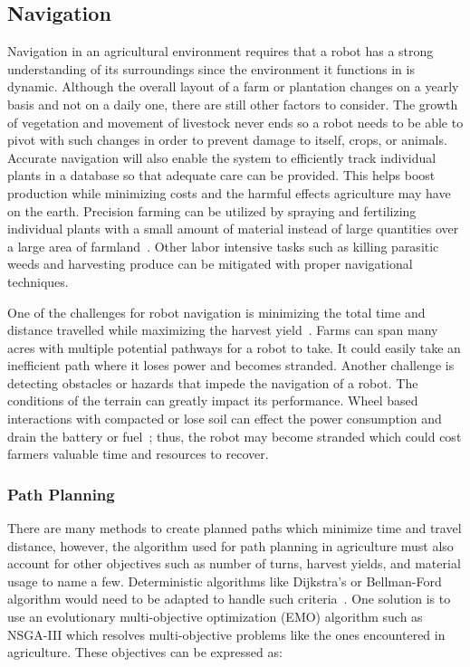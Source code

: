 \documentclass[12pt]{article}
\begin{document}
\subsection{Navigation}
Navigation in an agricultural environment requires that a robot has a strong understanding of its surroundings since the environment it functions in is dynamic. Although the overall layout of a farm or plantation changes on a yearly basis and not on a daily one, there are still other factors to consider. The growth of vegetation and movement of livestock never ends so a robot needs to be able to pivot with such changes in order to prevent damage to itself, crops, or animals. Accurate navigation will also enable the system to efficiently track individual plants in a database so that adequate care can be provided. This helps boost production while minimizing costs and the harmful effects agriculture may have on the earth. Precision farming can be utilized by spraying and fertilizing individual plants with a small amount of material instead of large quantities over a large area of farmland~\cite{LEPEJ2016160}. Other labor intensive tasks such as killing parasitic weeds and harvesting produce can be mitigated with proper navigational techniques.

One of the challenges for robot navigation is minimizing the total time and distance travelled while maximizing the harvest yield~\cite{MAHMUD2019488}. Farms can span many acres with multiple potential pathways for a robot to take. It could easily take an inefficient path where it loses power and becomes stranded. Another challenge is detecting obstacles or hazards that impede the navigation of a robot. The conditions of the terrain can greatly impact its performance. Wheel based interactions with compacted or lose soil can effect the power consumption and drain the battery or fuel~\cite{REINA2017124}; thus, the robot may become stranded which could cost farmers valuable time and resources to recover.

\subsubsection{Path Planning}
There are many methods to create planned paths which minimize time and travel distance, however, the algorithm used for path planning in agriculture must also account for other objectives such as number of turns, harvest yields, and material usage to name a few. Deterministic algorithms like Dijkstra's or Bellman-Ford algorithm would need to be adapted to handle such criteria~\cite{MAHMUD2019488}. One solution is to use an evolutionary multi-objective optimization (EMO) algorithm such as NSGA-III which resolves multi-objective problems like the ones encountered in agriculture. These objectives can be expressed as:
\end{document}
